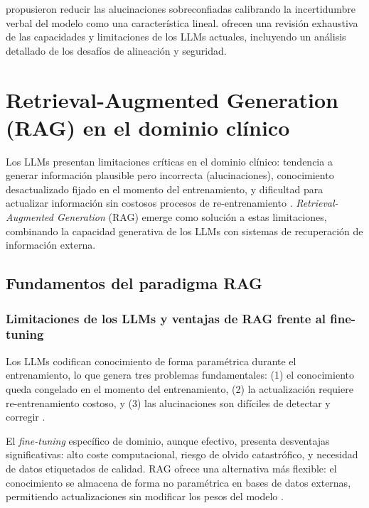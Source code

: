 \textcite{ji2025calibrating} propusieron reducir las alucinaciones sobreconfiadas calibrando la incertidumbre verbal del modelo como una característica lineal. \textcite{naveed2024comprehensive} ofrecen una revisión exhaustiva de las capacidades y limitaciones de los \ac{LLM}s actuales, incluyendo un análisis detallado de los desafíos de alineación y seguridad.

\section{Retrieval-Augmented Generation (\acs{RAG}) en el dominio clínico}
\label{sec:rag_clinico}

Los \ac{LLM}s presentan limitaciones críticas en el dominio clínico: tendencia a generar información plausible pero incorrecta (alucinaciones), conocimiento desactualizado fijado en el momento del entrenamiento, y dificultad para actualizar información sin costosos procesos de re-entrenamiento \parencite{lewis2020rag}. \textit{Retrieval-Augmented Generation} (\ac{RAG}) emerge como solución a estas limitaciones, combinando la capacidad generativa de los \ac{LLM}s con sistemas de recuperación de información externa.

\subsection{Fundamentos del paradigma RAG}
\label{subsec:fundamentos_rag}

\subsubsection{Limitaciones de los \ac{LLM}s y ventajas de \ac{RAG} frente al fine-tuning}

Los \ac{LLM}s codifican conocimiento de forma paramétrica durante el entrenamiento, lo que genera tres problemas fundamentales: (1) el conocimiento queda congelado en el momento del entrenamiento, (2) la actualización requiere re-entrenamiento costoso, y (3) las alucinaciones son difíciles de detectar y corregir \parencite{xiong2024medrag}.

El \textit{fine-tuning} específico de dominio, aunque efectivo, presenta desventajas significativas: alto coste computacional, riesgo de olvido catastrófico, y necesidad de datos etiquetados de calidad. \ac{RAG} ofrece una alternativa más flexible: el conocimiento se almacena de forma no paramétrica en bases de datos externas, permitiendo actualizaciones sin modificar los pesos del modelo \parencite{gao2023rag_survey}.

